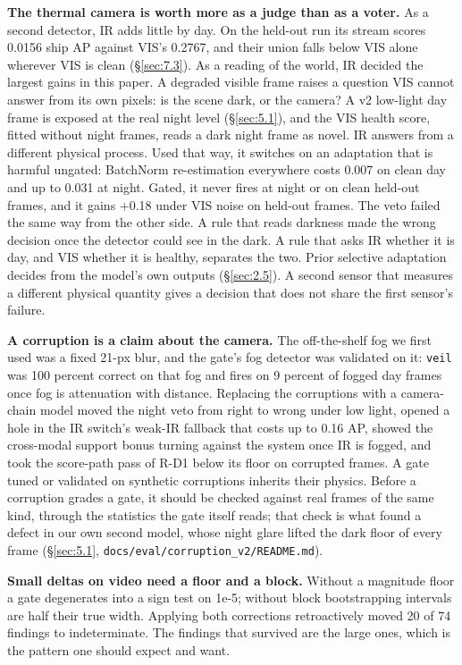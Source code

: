 \documentclass[10pt]{article}
\begin{document}
\textbf{The thermal camera is worth more as a judge than as a voter.} As a second detector, IR adds little by day. On the held-out run its stream scores 0.0156 ship AP against VIS's 0.2767, and their union falls below VIS alone wherever VIS is clean (\S\ref{sec:7.3}). As a reading of the world, IR decided the largest gains in this paper. A degraded visible frame raises a question VIS cannot answer from its own pixels: is the scene dark, or the camera? A v2 low-light day frame is exposed at the real night level (\S\ref{sec:5.1}), and the VIS health score, fitted without night frames, reads a dark night frame as novel. IR answers from a different physical process. Used that way, it switches on an adaptation that is harmful ungated: BatchNorm re-estimation everywhere costs 0.007 on clean day and up to 0.031 at night. Gated, it never fires at night or on clean held-out frames, and it gains +0.18 under VIS noise on held-out frames. The veto failed the same way from the other side. A rule that reads darkness made the wrong decision once the detector could see in the dark. A rule that asks IR whether it is day, and VIS whether it is healthy, separates the two. Prior selective adaptation decides from the model's own outputs (\S\ref{sec:2.5}). A second sensor that measures a different physical quantity gives a decision that does not share the first sensor's failure.

\textbf{A corruption is a claim about the camera.} The off-the-shelf fog we first used was a fixed 21-px blur, and the gate's fog detector was validated on it: \texttt{veil} was 100 percent correct on that fog and fires on 9 percent of fogged day frames once fog is attenuation with distance. Replacing the corruptions with a camera-chain model moved the night veto from right to wrong under low light, opened a hole in the IR switch's weak-IR fallback that costs up to 0.16 AP, showed the cross-modal support bonus turning against the system once IR is fogged, and took the score-path pass of R-D1 below its floor on corrupted frames. A gate tuned or validated on synthetic corruptions inherits their physics. Before a corruption grades a gate, it should be checked against real frames of the same kind, through the statistics the gate itself reads; that check is what found a defect in our own second model, whose night glare lifted the dark floor of every frame (\S\ref{sec:5.1}, \texttt{docs/\allowbreak{}eval/\allowbreak{}corruption\_\allowbreak{}v2/\allowbreak{}README.md}).

\textbf{Small deltas on video need a floor and a block.} Without a magnitude floor a gate degenerates into a sign test on 1e-5; without block bootstrapping intervals are half their true width. Applying both corrections retroactively moved 20 of 74 findings to indeterminate. The findings that survived are the large ones, which is the pattern one should expect and want.
\end{document}

